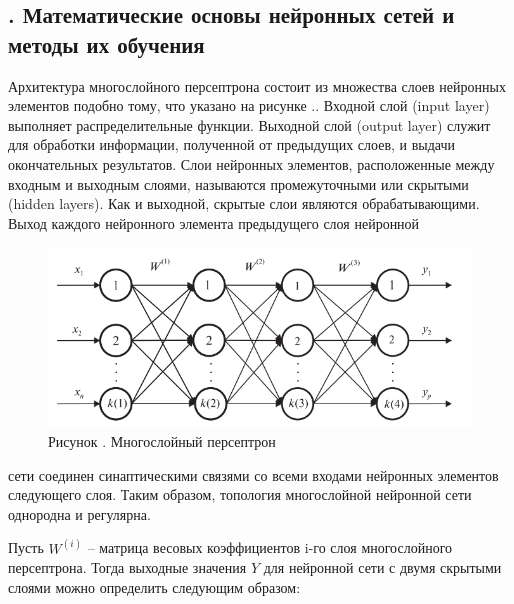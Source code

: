 \subtitlespace

\subsection*{
	\gostTitleFont
	\redline
	\thechaptercntr .\thesubchaptercntr \spc
	Математические основы нейронных сетей и методы их обучения
} \addtocounter{subchaptercntr}{1}

\subtitlespace

{\gostFont
	
	\par \redline Архитектура многослойного персептрона состоит из множества слоев нейронных элементов подобно тому, что указано на рисунке \spc \thechaptercntr .\theimagecntr. Входной слой (input layer) выполняет распределительные функции. Выходной слой (output layer) служит для обработки информации, полученной от предыдущих слоев, и выдачи окончательных результатов. Слои нейронных элементов, расположенные между входным и выходным слоями, называются промежуточными или скрытыми (hidden layers). Как и выходной, скрытые слои являются обрабатывающими. Выход каждого нейронного элемента предыдущего слоя нейронной 
	
	\begin{figure}[H]
		\centering
		\def\svgwidth{\textwidth}
		\includegraphics[scale=1.2]{images/perceptron.png}
		\caption*{\gostFont Рисунок \thechaptercntr .\theimagecntr \spc {--} Многослойный персептрон}
	\end{figure}  \addtocounter{imagecntr}{1}
	
	сети соединен синаптическими связями со всеми входами нейронных элементов следующего слоя. Таким образом, топология многослойной нейронной сети однородна и регулярна.
	
	\par \redline Пусть $W^{(i)}$  {--} матрица весовых коэффициентов i-го слоя многослойного персептрона. Тогда выходные значения $Y$ для нейронной сети с двумя скрытыми слоями можно определить следующим образом:
	
}
